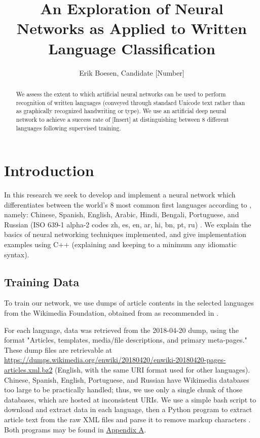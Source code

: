 \documentclass{article}
\begin{document}
\title{An Exploration of Neural Networks as Applied to Written Language Classification}
\author{Erik Boesen, Candidate [Number]}
\maketitle

\begin{abstract}
We assess the extent to which artificial neural networks can be used to perform recognition of written languages (conveyed through standard Unicode text rather than as graphically recognized handwriting or type). We use an artificial deep neural network to achieve a success rate of [Insert] at distinguishing between 8 different languages following supervised training.
\end{abstract}

\section{Introduction}
In this research we seek to develop and implement a neural network which differentiates between the world's 8 most common first languages according to \cite{ethnologue}, namely: Chinese, Spanish, English, Arabic, Hindi, Bengali, Portuguese, and Russian (ISO 639-1 alpha-2 codes zh, es, en, ar, hi, bn, pt, ru) \cite{iso639}. We explain the basics of neural networking techniques implemented, and give implementation examples using C++ (explaining and keeping to a minimum any idiomatic syntax).

\subsection{Training Data}
To train our network, we use dumps of article contents in the selected languages from the Wikimedia Foundation, obtained from \cite{wikidumps} as recommended in \cite{langsamp}. %

For each language, data was retrieved from the 2018-04-20 dump, using the format "Articles, templates, media/file descriptions, and primary meta-pages." These dump files are retrievable at \url{https://dumps.wikimedia.org/enwiki/20180420/enwiki-20180420-pages-articles.xml.bz2} (English, with the same URI format used for other languages). Chinese, Spanish, English, Portuguese, and Russian have Wikimedia databases too large to be practically handled; thus, we use only a single chunk of those databases, which are hosted at inconsistent URIs. We use a simple bash script to download and extract data in each language, then a Python program to extract article text from the raw XML files and parse it to remove markup characters \cite{parsewikixml}. Both programs may be found in \hyperref[sec:appendix_a]{Appendix A}.
\end{document}
